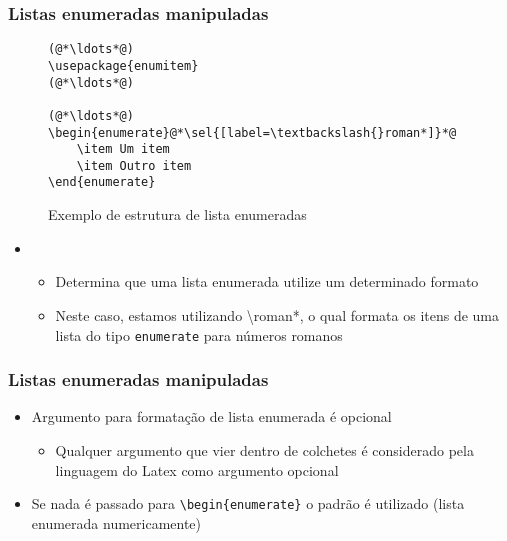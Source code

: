 \begin{frame}[fragile] \frametitle{Listas enumeradas manipuladas}
\begin{figure}[!t]
\caption{Exemplo de estrutura de lista enumeradas}
\begin{lstlisting}
(@*\ldots*@)
\usepackage{enumitem}
(@*\ldots*@)

(@*\ldots*@)
\begin{enumerate}@*\sel{[label=\textbackslash{}roman*]}*@
	\item Um item
	\item Outro item
\end{enumerate}
\end{lstlisting}
\ownsrc
\end{figure}

\begin{itemize}
	\item \sel{[label=formato]}
	\begin{itemize}
		\item Determina que uma lista enumerada utilize um determinado formato
		\item Neste caso, estamos utilizando \textbackslash{}roman*, o qual formata os itens de uma lista do tipo \texttt{enumerate} para números romanos
	\end{itemize}
\end{itemize}
\end{frame}

\begin{frame}[fragile] \frametitle{Listas enumeradas manipuladas}
\begin{itemize}
	\item Argumento para formatação de lista enumerada é opcional
	\begin{itemize}
		\item Qualquer argumento que vier dentro de colchetes é considerado pela linguagem do Latex como argumento opcional
	\end{itemize}
	\item Se nada é passado para \texttt{\textbackslash{}begin\{enumerate\}} o padrão é utilizado (lista enumerada numericamente)
\end{itemize}
\end{frame}

